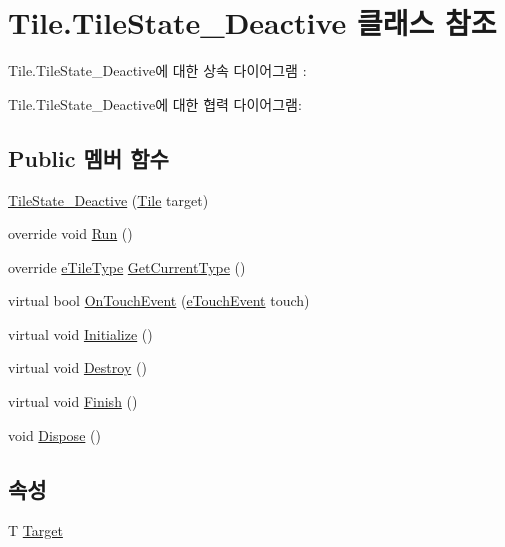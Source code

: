 \hypertarget{class_tile_1_1_tile_state___deactive}{}\section{Tile.\+Tile\+State\+\_\+\+Deactive 클래스 참조}
\label{class_tile_1_1_tile_state___deactive}


Tile.\+Tile\+State\+\_\+\+Deactive에 대한 상속 다이어그램 \+: 


Tile.\+Tile\+State\+\_\+\+Deactive에 대한 협력 다이어그램\+:
\subsection*{Public 멤버 함수}
\begin{DoxyCompactItemize}
\item 
\hyperlink{class_tile_1_1_tile_state___deactive_af238bc1bded3aea43c93b71f4428d8e5}{Tile\+State\+\_\+\+Deactive} (\hyperlink{class_tile}{Tile} target)
\item 
override void \hyperlink{class_tile_1_1_tile_state___deactive_a806c5dbc5eb43903ad41d448f3d25c61}{Run} ()
\item 
override \hyperlink{_tile_8cs_a271bc07be325bca511bcb747e0ff2fda}{e\+Tile\+Type} \hyperlink{class_tile_1_1_tile_state___deactive_a1aed8e0336e11dcb55cb598119c53eda}{Get\+Current\+Type} ()
\item 
virtual bool \hyperlink{class_tile_1_1_tile_state_a8687f7cb0e2c1a436c5ac395f4f6d07a}{On\+Touch\+Event} (\hyperlink{_touch_manager_8cs_ae33e321a424fe84ba8b2fdb81ad40a68}{e\+Touch\+Event} touch)
\item 
virtual void \hyperlink{class_f_z_1_1_state_a27ac6fd2e844476017b35aa781d73c8c}{Initialize} ()
\item 
virtual void \hyperlink{class_f_z_1_1_state_aa85fdf4a5495d6d5d3ed4aeda3497c8a}{Destroy} ()
\item 
virtual void \hyperlink{class_f_z_1_1_state_a288bb8c3fceee4bf03f01e295dcef1be}{Finish} ()
\item 
void \hyperlink{class_f_z_1_1_state_a598887d3fbb412fada132dc1c079b25b}{Dispose} ()
\end{DoxyCompactItemize}
\subsection*{속성}
\begin{DoxyCompactItemize}
\item 
T \hyperlink{class_f_z_1_1_state_a6927f5c9f2517052f9dc5596188e9d95}{Target}
\end{DoxyCompactItemize}
